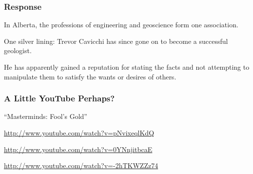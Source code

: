 \begin{frame}
\frametitle{Response}

In Alberta, the professions of engineering and geoscience form one association.

One silver lining: Trevor Cavicchi has since gone on to become a successful geologist.

He has apparently gained a reputation for stating the facts and not attempting to manipulate them to satisfy the wants or desires of others.

\end{frame}



\begin{frame}
\frametitle{A Little YouTube Perhaps?}

``Masterminds: Fool's Gold''

\url{http://www.youtube.com/watch?v=pNvixeqlKdQ}

\url{http://www.youtube.com/watch?v=0YNnjitbcaE}

\url{http://www.youtube.com/watch?v=-2hTKWZZz74}


\end{frame}





